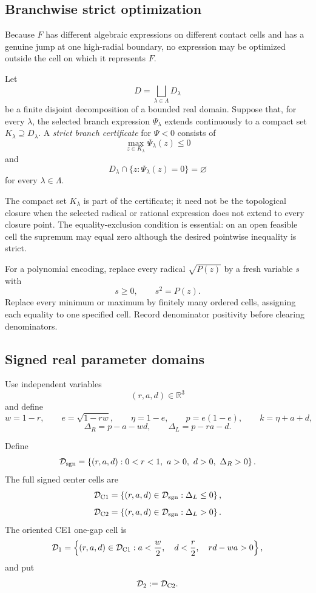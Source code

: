 \subsection{Branchwise strict optimization}

Because \(F\) has different algebraic expressions on different contact cells
and has a genuine jump at one high-radial boundary, no expression may be
optimized outside the cell on which it represents \(F\).

\begin{definition}
\label{def:s2-pure-strict-certificate}
Let
\[
 D=\bigsqcup_{\lambda\in\Lambda}D_\lambda
\]
be a finite disjoint decomposition of a bounded real domain.  Suppose that,
for every \(\lambda\), the selected branch expression
\(\Psi_\lambda\) extends continuously to a compact set
\(K_\lambda\supseteq D_\lambda\).  A \emph{strict branch certificate} for
\(\Psi<0\) consists of
\[
 \max_{z\in K_\lambda}\Psi_\lambda(z)\le0
\]
and
\[
 D_\lambda\cap\{z:\Psi_\lambda(z)=0\}=\varnothing
\]
for every \(\lambda\in\Lambda\).
\end{definition}

The compact set \(K_\lambda\) is part of the certificate; it need not be the
topological closure when the selected radical or rational expression does not
extend to every closure point.  The equality-exclusion condition is essential:
on an open feasible cell the supremum may equal zero although the desired
pointwise inequality is strict.

For a polynomial encoding, replace every radical \(\sqrt{P(z)}\) by a fresh
variable \(s\) with
\[
 s\ge0,\qquad s^2=P(z).
\]
Replace every minimum or maximum by finitely many ordered cells, assigning
each equality to one specified cell.  Record denominator positivity before
clearing denominators.

\subsection{Signed real parameter domains}

Use independent variables
\[
 (r,a,d)\in\mathbb R^3
\]
and define
\[
 w=1-r,\qquad
 e=\sqrt{1-rw},\qquad
 \eta=1-e,\qquad
 p=e(1-e),\qquad
 k=\eta+a+d,
\]
\[
 \Delta_R=p-a-wd,
 \qquad
 \Delta_L=p-ra-d.
\]

\begin{definition}
\label{def:s2-pure-signed-domains}
Define
\[
 \mathcal D_{\rm sgn}
 =
 \left\{
 (r,a,d):
 0<r<1,\ a>0,\ d>0,\ \Delta_R>0
 \right\}.
\]
The full signed center cells are
\[
 \mathcal D_{\rm C1}
 =
 \left\{(r,a,d)\in\mathcal D_{\rm sgn}:\Delta_L\le0\right\},
\]
\[
 \mathcal D_{\rm C2}
 =
 \left\{(r,a,d)\in\mathcal D_{\rm sgn}:\Delta_L>0\right\}.
\]
The oriented CE1 one-gap cell is
\[
 \mathcal D_1
 =
 \left\{
 (r,a,d)\in\mathcal D_{\rm C1}:
 a<\frac w2,\quad d<\frac r2,\quad rd-wa>0
 \right\},
\]
and put
\[
 \mathcal D_2:=\mathcal D_{\rm C2}.
\]
\end{definition}


